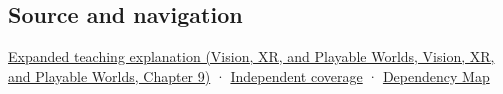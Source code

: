 \subsection{Source and navigation}\label{appendix-7281c15ac44a-source-and-navigation}

\href{../07-Vision-XR-and-Playable-Worlds/main.pdf\#nameddest=04-visual-computing-ii-ch042-the-eye-is-an-optical-instrument-with-neural-processing-inside-it}{Expanded teaching explanation (Vision, XR, and Playable Worlds, Vision, XR, and Playable Worlds, Chapter 9)} · \hyperref[appendix-fd090d982a15-xr01---independent-seeing-and-representation-source]{Independent coverage} · \hyperref[appendix-4ad47bdd269a]{Dependency Map}

